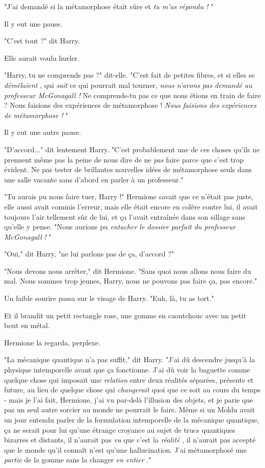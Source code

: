 "J'ai demandé si la métamorphose était sûre et \emph{tu m'as répondu !} "

Il y eut une pause.

"C'est tout ?" dit Harry.

Elle aurait voulu hurler.

"Harry, tu ne comprends pas ?" dit-elle. "C'est fait de petites fibres, et si elles se \emph{démêlaient} , qui \emph{sait}  ce qui pourrait mal tourner, \emph{nous n'avons pas demandé au professeur McGonagall !}  Ne comprends-tu pas ce que nous étions en train de faire ? Nous faisions des expériences de métamorphose ! \emph{Nous faisions des expériences de métamorphose !} "

Il y eut une autre pause.

"D'accord..." dit lentement Harry. "C'est probablement une de ces choses qu'ils ne prennent même pas la peine de nous dire de ne \emph{pas}  faire parce que c'est trop évident. Ne pas tester de brillantes nouvelles idées de métamorphose seuls dans une salle vacante sans d'abord en parler à un professeur."

"Tu aurais pu nous faire tuer, Harry !" Hermione savait que ce n'était pas juste, elle aussi avait commis l'erreur, mais elle était encore en colère contre lui, il avait toujours l'air tellement sûr de lui, et ça l'avait entraînée dans son sillage sans qu'elle y pense. "Nous aurions pu \emph{entacher le dossier parfait du professeur McGonagall}  \emph{!} "

"Oui," dit Harry, "ne lui parlons pas de ça, d'accord ?"

"Nous devons nous arrêter," dit Hermione. "Sans quoi nous allons nous faire du mal. Nous sommes trop jeunes, Harry, nous ne pouvons pas faire ça, pas encore."

Un faible sourire passa sur le visage de Harry. "Euh, là, tu as tort."

Et il brandit un petit rectangle rose, une gomme en caoutchouc avec un petit bout en métal.

Hermione la regarda, perplexe.

"La mécanique quantique n'a pas suffit," dit Harry. "J'ai dû descendre jusqu'à la physique intemporelle avant que ça fonctionne. J'ai dû voir la baguette comme quelque chose qui imposait une \emph{relation}  entre deux réalités séparées, présente et future, au lieu de quelque chose qui \emph{changerait}  quoi que ce soit au cours du temps - mais je l'ai fait, Hermione, j'ai vu par-delà l'illusion des objets, et je parie que pas un seul autre sorcier au monde ne pourrait le faire. Même si un Moldu avait un jour entendu parler de la formulation intemporelle de la mécanique quantique, ça ne serait pour lui qu'une étrange croyance au sujet de trucs quantiques bizarres et distants, il n'aurait pas \emph{vu } que c'est la \emph{réalité} , il n'aurait pas accepté que le monde qu'il connaît n'est qu'une hallucination. J'ai métamorphosé une \emph{partie}  de la gomme sans la changer \emph{en entier} ."

